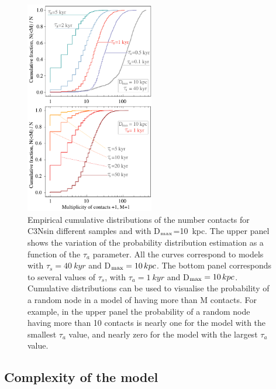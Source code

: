 \documentclass[crop]{CSLB}
\newcommand{\cetis}{C3Ns}
\begin{document}
 
\begin{figure} \centering
   \includegraphics[width=0.5\textwidth]{F_number_of_contacts.pdf}
   \caption{
Empirical cumulative distributions of the number contacts
   for \cetis in different samples and with D$_{\rm max}$=10~kpc.
%
The upper panel shows the variation of the probability distribution
   estimation as a function of the $\tau_a$ parameter.  All the curves
   correspond to models with 
   $\tau_s=40~kyr$ and D$_{\rm max}=10\,kpc$.
%
The bottom panel corresponds to several values of $\tau_s$, with
   $\tau_a=1~kyr$ and D$_{\rm max}=10\,kpc$.
%
   Cumulative distributions can be used to visualise the probability
   of a random node in a model of having more than M contacts.  For
   example, in the upper panel the probability of a random node having
   more than 10 contacts is nearly one for the model with the
   smallest $\tau_a$ value, and nearly zero for the model with the
   largest $\tau_a$ value.
   } \label{F_number_of_contacts}
\end{figure}
        
 

\subsection{Complexity of the model}
\end{document}
